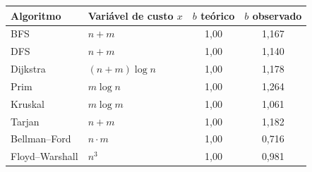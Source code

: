 \begin{tabular}{llcc}
\hline
\textbf{Algoritmo} & \textbf{Variável de custo $x$} & $b$ \textbf{teórico} & $b$ \textbf{observado} \\ \hline
BFS & $n+m$ & 1,00 & 1,167 \\
DFS & $n+m$ & 1,00 & 1,140 \\
Dijkstra & $(n+m)\log n$ & 1,00 & 1,178 \\
Prim & $m\log n$ & 1,00 & 1,264 \\
Kruskal & $m\log m$ & 1,00 & 1,061 \\
Tarjan & $n+m$ & 1,00 & 1,182 \\
Bellman--Ford & $n\cdot m$ & 1,00 & 0,716 \\
Floyd--Warshall & $n^3$ & 1,00 & 0,981 \\
\hline
\end{tabular}
